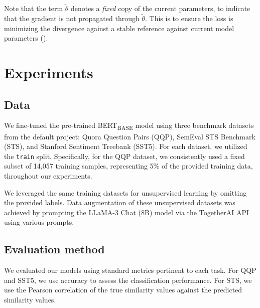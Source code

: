 \documentclass{article}
\begin{document}
Note that the term $\tilde{\theta}$ denotes a \textit{fixed} copy of the current parameters, 
to indicate that the gradient is not propagated through $\tilde{\theta}$.
This is to ensure the loss is minimizing the divergence against a stable reference against
current model parameters (\cite{miyato2018virtual}).

\section{Experiments}

\subsection{Data}
We fine-tuned the pre-trained BERT\textsubscript{BASE} model using three benchmark datasets 
from the default project: Quora Question Pairs (QQP), SemEval STS Benchmark (STS), and 
Stanford Sentiment Treebank (SST5). For each dataset, we utilized the \texttt{train} split. 
Specifically, for the QQP dataset, we consistently used a fixed subset of 14,057 training 
samples, representing 5\% of the provided training data, throughout our experiments.

We leveraged the same training datasets for unsupervised learning by omitting the provided labels. 
Data augmentation of these unsupervised datasets was achieved by prompting the LLaMA-3 Chat 
(8B) model via the TogetherAI API using various prompts.

\subsection{Evaluation method}
We evaluated our models using standard metrics pertinent to each task. 
For QQP and SST5, we use accuracy to assess the classification performance. 
For STS, we use the Pearson correlation of the true similarity values against the predicted 
similarity values.
\end{document}
